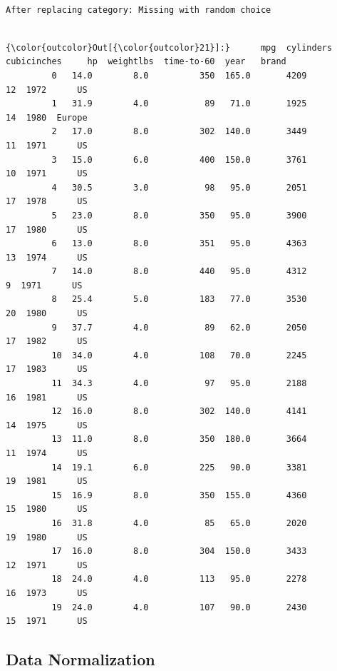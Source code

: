 \documentclass[11pt]{article}
\begin{document}
    \begin{Verbatim}[commandchars=\\\{\}]

After replacing category: Missing with random choice


    \end{Verbatim}

\begin{Verbatim}[commandchars=\\\{\}]
{\color{outcolor}Out[{\color{outcolor}21}]:}      mpg  cylinders  cubicinches     hp  weightlbs  time-to-60  year   brand
         0   14.0        8.0          350  165.0       4209          12  1972      US
         1   31.9        4.0           89   71.0       1925          14  1980  Europe
         2   17.0        8.0          302  140.0       3449          11  1971      US
         3   15.0        6.0          400  150.0       3761          10  1971      US
         4   30.5        3.0           98   95.0       2051          17  1978      US
         5   23.0        8.0          350   95.0       3900          17  1980      US
         6   13.0        8.0          351   95.0       4363          13  1974      US
         7   14.0        8.0          440   95.0       4312           9  1971      US
         8   25.4        5.0          183   77.0       3530          20  1980      US
         9   37.7        4.0           89   62.0       2050          17  1982      US
         10  34.0        4.0          108   70.0       2245          17  1983      US
         11  34.3        4.0           97   95.0       2188          16  1981      US
         12  16.0        8.0          302  140.0       4141          14  1975      US
         13  11.0        8.0          350  180.0       3664          11  1974      US
         14  19.1        6.0          225   90.0       3381          19  1981      US
         15  16.9        8.0          350  155.0       4360          15  1980      US
         16  31.8        4.0           85   65.0       2020          19  1980      US
         17  16.0        8.0          304  150.0       3433          12  1971      US
         18  24.0        4.0          113   95.0       2278          16  1973      US
         19  24.0        4.0          107   90.0       2430          15  1971      US
\end{Verbatim}
            
    \subsection{Data Normalization}\label{data-normalization}
\end{document}
